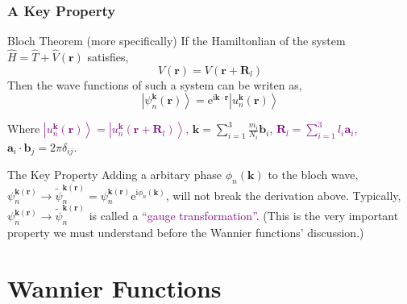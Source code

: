 \documentclass{beamer}
\begin{document}
  \begin{frame}
    \frametitle{A Key Property}

    \begin{block}{Bloch Theorem (more specifically)}
      \small
      If the Hamiltonlian of the system \(\widehat{H} = \widehat{T} + \widehat{V}(\mathbf{r})\) satisfies, 
      \begin{equation*}
        V(\mathbf{r}) = V(\mathbf{r}+\mathbf{R}_l)
      \end{equation*}
      Then the wave functions of such a system can be writen as,
      \begin{equation*}
        \left|\psi_n^{\mathbf{k}}(\mathbf{r})\right\rangle = \mathrm{e}^{\mathrm{i}\mathbf{k}\cdot\mathbf{r}}\left|u_n^{\mathbf{k}}(\mathbf{r})\right\rangle
      \end{equation*}
      
      Where  \textcolor{purple}{\(\left|u_n^{\mathbf{k}}(\mathbf{r})\right\rangle = \left|u_n^{\mathbf{k}}(\mathbf{r}+\mathbf{R}_l)\right\rangle\),} \(\mathbf{k} = \sum_{i=1}^3\frac{m_i}{N_i}\mathbf{b}_i\), \textcolor{purple}{\(\mathbf{R}_l = \sum_{i=1}^3l_i\mathbf{a}_i\),} \(\mathbf{a}_i\cdot\mathbf{b}_j = 2\pi\delta_{ij}\).
    \end{block}

    \begin{block}{The Key Property}
      \small
      Adding a arbitary phase \(\phi_n(\mathbf{k})\) to the bloch wave, \(\psi_n^{\mathbf{k}(\mathbf{r})} \to \tilde\psi_n^{\mathbf{k}(\mathbf{r})} = \psi_n^{\mathbf{k}(\mathbf{r})}\mathrm{e}^{\mathrm{i}\phi_n(\mathbf{k})}\),  will not break the derivation above. Typically, \(\psi_n^{\mathbf{k}(\mathbf{r})} \to \tilde\psi_n^{\mathbf{k}(\mathbf{r})}\) is called a \textcolor{purple}{``gauge transformation''}. (This is the very important property we must understand before the Wannier functions' discussion.)
    \end{block}

    \end{frame}

  \section{Wannier Functions}
\end{document}
